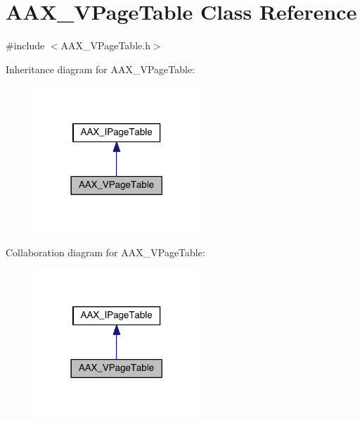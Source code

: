 \hypertarget{a00138}{}\section{A\+A\+X\+\_\+\+V\+Page\+Table Class Reference}
\label{a00138}


{\ttfamily \#include $<$A\+A\+X\+\_\+\+V\+Page\+Table.\+h$>$}



Inheritance diagram for A\+A\+X\+\_\+\+V\+Page\+Table\+:
\nopagebreak
\begin{figure}[H]
\begin{center}
\leavevmode
\includegraphics[width=177pt]{a00710}
\end{center}
\end{figure}


Collaboration diagram for A\+A\+X\+\_\+\+V\+Page\+Table\+:
\nopagebreak
\begin{figure}[H]
\begin{center}
\leavevmode
\includegraphics[width=177pt]{a00711}
\end{center}
\end{figure}


